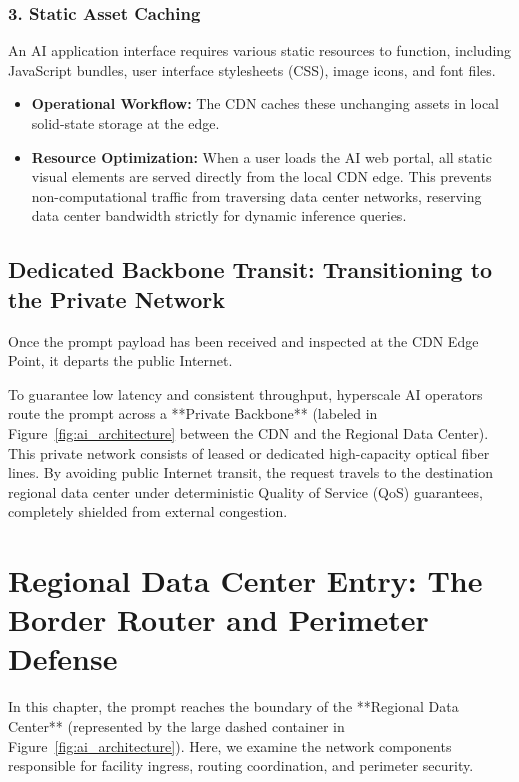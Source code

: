 \documentclass[12pt,a4paper]{report}
\begin{document}
\subsection{3. Static Asset Caching}
An AI application interface requires various static resources to function, including JavaScript bundles, user interface stylesheets (CSS), image icons, and font files.
\begin{itemize}[leftmargin=1.2cm]
    \item \textbf{Operational Workflow:} The CDN caches these unchanging assets in local solid-state storage at the edge.
    \item \textbf{Resource Optimization:} When a user loads the AI web portal, all static visual elements are served directly from the local CDN edge. This prevents non-computational traffic from traversing data center networks, reserving data center bandwidth strictly for dynamic inference queries.
\end{itemize}

\section{Dedicated Backbone Transit: Transitioning to the Private Network}
Once the prompt payload has been received and inspected at the CDN Edge Point, it departs the public Internet. 

To guarantee low latency and consistent throughput, hyperscale AI operators route the prompt across a **Private Backbone** (labeled in Figure~\ref{fig:ai_architecture} between the CDN and the Regional Data Center). This private network consists of leased or dedicated high-capacity optical fiber lines. By avoiding public Internet transit, the request travels to the destination regional data center under deterministic Quality of Service (QoS) guarantees, completely shielded from external congestion.

\chapter{Regional Data Center Entry: The Border Router and Perimeter Defense}

In this chapter, the prompt reaches the boundary of the **Regional Data Center** (represented by the large dashed container in Figure~\ref{fig:ai_architecture}). Here, we examine the network components responsible for facility ingress, routing coordination, and perimeter security.
\end{document}
